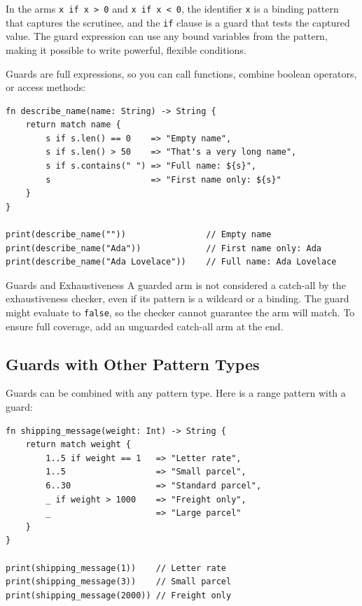 In the arms \lstinline|x if x > 0| and \lstinline|x if x < 0|, the identifier \lstinline|x| is a binding pattern that captures the scrutinee, and the \lstinline|if| clause is a guard that tests the captured value. The guard expression can use any bound variables from the pattern, making it possible to write powerful, flexible conditions.

Guards are full expressions, so you can call functions, combine boolean operators, or access methods:

\begin{lstlisting}[language=Lattice, caption={Complex guard expressions}]
fn describe_name(name: String) -> String {
    return match name {
        s if s.len() == 0    => "Empty name",
        s if s.len() > 50    => "That's a very long name",
        s if s.contains(" ") => "Full name: ${s}",
        s                    => "First name only: ${s}"
    }
}

print(describe_name(""))                // Empty name
print(describe_name("Ada"))             // First name only: Ada
print(describe_name("Ada Lovelace"))    // Full name: Ada Lovelace
\end{lstlisting}

\begin{notebox}{Guards and Exhaustiveness}
A guarded arm is not considered a catch-all by the exhaustiveness checker, even if its pattern is a wildcard or a binding. The guard might evaluate to \lstinline|false|, so the checker cannot guarantee the arm will match. To ensure full coverage, add an unguarded catch-all arm at the end.
\end{notebox}

\subsection{Guards with Other Pattern Types}\label{sec:guards-with-patterns}

Guards can be combined with any pattern type. Here is a range pattern with a guard:

\begin{lstlisting}[language=Lattice, caption={Combining range patterns and guards}]
fn shipping_message(weight: Int) -> String {
    return match weight {
        1..5 if weight == 1   => "Letter rate",
        1..5                  => "Small parcel",
        6..30                 => "Standard parcel",
        _ if weight > 1000    => "Freight only",
        _                     => "Large parcel"
    }
}

print(shipping_message(1))    // Letter rate
print(shipping_message(3))    // Small parcel
print(shipping_message(2000)) // Freight only
\end{lstlisting}

